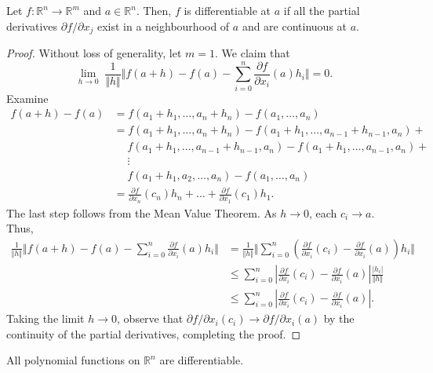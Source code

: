 \documentclass[11pt]{article}
\newcommand{\R}{\mathbb{R}}
\newcommand{\norm}[1]{\Vert #1 \Vert}
\newcommand{\pp}[2]{\frac{\partial #1}{\partial #2}}
\theoremstyle{definition}
\theoremstyle{remark}
\numberwithin{equation}{section}
\begin{document}
    \begin{theorem}
        Let $f\colon \R^n \to \R^m$ and $a \in \R^n$. Then, $f$ is differentiable at
        $a$ if all the partial derivatives $\partial f / \partial x_j$ exist in a
        neighbourhood of $a$ and are continuous at $a$.
    \end{theorem}
    \begin{proof}
        Without loss of generality, let $m = 1$. We claim that \[
            \lim_{h \to 0} \;\frac{1}{\norm{h}}\norm{f(a + h) - f(a) - \sum_{i = 0}^n
            \pp{f}{x_i}(a)h_i} = 0.
        \] Examine \begin{align*}
            f(a + h) - f(a) &= f(a_1 + h_1, \dots, a_n + h_n) - f(a_1, \dots, a_n) \\
            &= f(a_1 + h_1, \dots, a_n + h_n) - f(a_1 + h_1, \dots, a_{n - 1} + h_{n
            - 1}, a_n) + \\ 
            &\;\quad f(a_1 + h_1, \dots, a_{n - 1} + h_{n - 1}, a_n) - f(a_1 + h_1,
            \dots, a_{n - 1}, a_n) + \\
            &\;\quad \vdots \\
            &\;\quad f(a_1 + h_1, a_2, \dots, a_n) - f(a_1, \dots, a_n) \\
            &= \pp{f}{x_n}(c_n)h_n + \dots + \pp{f}{x_1}(c_1)h_1.
        \end{align*}
        The last step follows from the Mean Value Theorem. As $h \to 0$, each $c_i
        \to a$. Thus, \begin{align*}
            \frac{1}{\norm{h}}\norm{f(a + h) - f(a) - \sum_{i = 0}^n
            \pp{f}{x_i}(a)h_i} 
            &= \frac{1}{\norm{h}}\norm{\sum_{i = 0}^n \left(\pp{f}{x_i}(c_i) -
            \pp{f}{x_i}(a)\right)h_i} \\
            &\leq \sum_{i = 0}^n \left|\pp{f}{x_i}(c_i) - \pp{f}{x_i}(a)\right|
            \frac{|h_i|}{\norm{h}} \\
            &\leq \sum_{i = 0}^n \left|\pp{f}{x_i}(c_i) - \pp{f}{x_i}(a)\right|.
        \end{align*}
        Taking the limit $h \to 0$, observe that $\partial f / \partial x_i (c_i) \to
        \partial f / \partial x_i (a)$ by the continuity of the partial derivatives,
        completing the proof.
    \end{proof}

    \begin{corollary}
        All polynomial functions on $\R^n$ are differentiable.
    \end{corollary}
\end{document}
